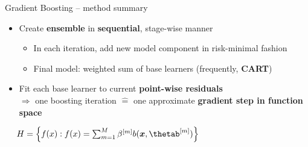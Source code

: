 \begin{frame}{Gradient Boosting -- method summary}

 

\medskip


\begin{itemize}
  \item Create \textbf{ensemble} in \textbf{sequential}, stage-wise manner
  \begin{itemize}
    \item In each iteration, add new model component in risk-minimal fashion
    \item Final model: weighted sum of base learners (frequently, \textbf{CART})
  \end{itemize}
  \item Fit each base learner to current \textbf{point-wise residuals} 
  \\ $\Rightarrow$ one boosting iteration $\widehat{=}$ one approximate 
  \textbf{gradient step in function space}
\end{itemize}

\medskip

 ~~
$\Hspace = \left\{ \fx: \fx = \sum_{m = 1}^M \betam b(\xv, \thetam) \right\}$


\end{frame}
